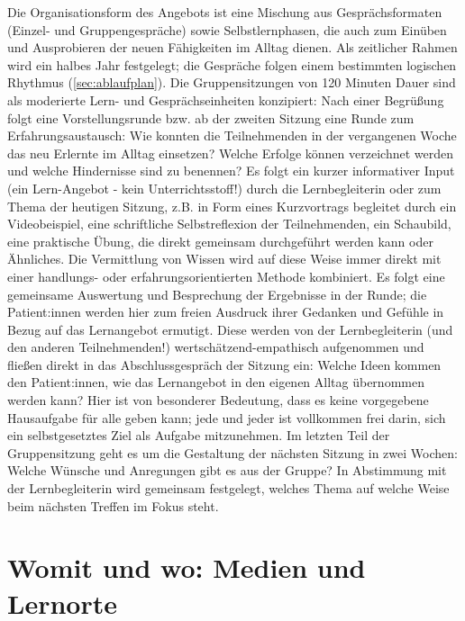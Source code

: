\documentclass[
  twoside,
  parskip=half-,
]{scrreprt}
\begin{document}
\begin{praxis}
  Die Organisationsform des Angebots ist eine Mischung aus Gesprächsformaten (Einzel- und Gruppengespräche) sowie Selbstlernphasen, die auch zum Einüben und Ausprobieren der neuen Fähigkeiten im Alltag dienen. Als zeitlicher Rahmen wird ein halbes Jahr festgelegt; die Gespräche folgen einem bestimmten logischen Rhythmus (\autoref{sec:ablaufplan}). Die Gruppensitzungen von 120 Minuten Dauer sind als moderierte Lern- und Gesprächseinheiten konzipiert:  Nach einer Begrüßung folgt eine Vorstellungsrunde bzw. ab der zweiten Sitzung eine Runde zum Erfahrungsaustausch: Wie konnten die Teilnehmenden in der vergangenen Woche das neu Erlernte im Alltag einsetzen? Welche Erfolge können verzeichnet werden und welche Hindernisse sind zu benennen? Es folgt ein kurzer informativer Input (ein Lern-Angebot - kein Unterrichtsstoff!) durch die Lernbegleiterin oder zum Thema der heutigen Sitzung, z.B. in Form eines Kurzvortrags begleitet durch ein Videobeispiel, eine schriftliche Selbstreflexion der Teilnehmenden, ein Schaubild, eine praktische Übung, die direkt gemeinsam durchgeführt werden kann oder Ähnliches. Die Vermittlung von Wissen wird auf diese Weise immer direkt mit einer handlungs- oder erfahrungsorientierten Methode kombiniert. Es folgt eine gemeinsame Auswertung und Besprechung der Ergebnisse in der Runde; die Patient:innen werden hier zum freien Ausdruck ihrer Gedanken und Gefühle in Bezug auf das Lernangebot ermutigt. Diese werden von der Lernbegleiterin (und den anderen Teilnehmenden!) wertschätzend-empathisch aufgenommen und fließen direkt in das Abschlussgespräch der Sitzung ein: Welche Ideen kommen den Patient:innen, wie das Lernangebot in den eigenen Alltag übernommen werden kann? Hier ist von besonderer Bedeutung, dass es keine vorgegebene Hausaufgabe für alle geben kann; jede und jeder ist vollkommen frei darin, sich ein selbstgesetztes Ziel als Aufgabe mitzunehmen. Im letzten Teil der Gruppensitzung geht es um die Gestaltung der nächsten Sitzung in zwei Wochen: Welche Wünsche und Anregungen gibt es aus der Gruppe? In Abstimmung mit der Lernbegleiterin wird gemeinsam festgelegt, welches Thema auf welche Weise beim nächsten Treffen im Fokus steht.
\end{praxis}

\section{Womit und wo: Medien und Lernorte}
\end{document}
